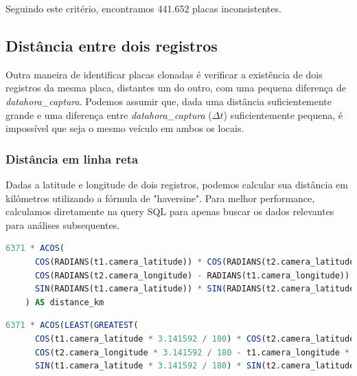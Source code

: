 \documentclass{article}
\begin{document}
Seguindo este critério, encontramos 441.652 placas inconsistentes.


\subsection{Distância entre dois registros}

Outra maneira de identificar placas clonadas é verificar a existência de dois registros da mesma placa, distantes um do outro, com uma pequena diferença de \textit{datahora\_captura}. Podemos assumir que, dada uma distância suficientemente grande e uma diferença entre \textit{datahora\_captura} ($\Delta t$) suficientemente pequena, é impossível que seja o mesmo veículo em ambos os locais.

\subsubsection{Distância em linha reta}

Dadas a latitude e longitude de dois registros, podemos calcular sua distância em kilômetros utilizando a fórmula de "haversine". Para melhor performance, calculamos diretamente na query SQL para apenas buscar os dados relevantes para análises subsequentes.

\begin{lstlisting}[language=SQL,caption={Fórmula de haversine para calcular distâncias em kilometros na superfície da Terra, através de latitudes e longitudes.},label={lst:sqlquery}]
 6371 * ACOS(
      COS(RADIANS(t1.camera_latitude)) * COS(RADIANS(t2.camera_latitude)) *
      COS(RADIANS(t2.camera_longitude) - RADIANS(t1.camera_longitude)) +
      SIN(RADIANS(t1.camera_latitude)) * SIN(RADIANS(t2.camera_latitude))
    ) AS distance_km
\end{lstlisting}

\begin{lstlisting}[language=SQL,caption={Fórmula de haversine para calcular distâncias em kilometros na superfície da Terra, através de latitudes e longitudes. Sem acesso à função RADIANS() nem PI() e resolvendo erro de float point precision na função ACOS().},label={lst:sqlquery}]
6371 * ACOS(LEAST(GREATEST(
      COS(t1.camera_latitude * 3.141592 / 180) * COS(t2.camera_latitude * 3.141592 / 180) * 
      COS(t2.camera_longitude * 3.141592 / 180 - t1.camera_longitude * 3.141592 / 180) + 
      SIN(t1.camera_latitude * 3.141592 / 180) * SIN(t2.camera_latitude * 3.141592 / 180),-1),1)) AS distance_km
\end{lstlisting}
\end{document}
